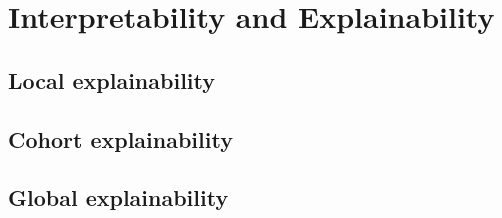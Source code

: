 \chapter{Interpretability and Explainability}
\label{ch:interpretability_explainability}


\section{Local explainability}
\label{sec:local_explainability}

\section{Cohort explainability}
\label{sec:cohort_explainability}


\section{Global explainability}
\label{sec:global_explainability}
